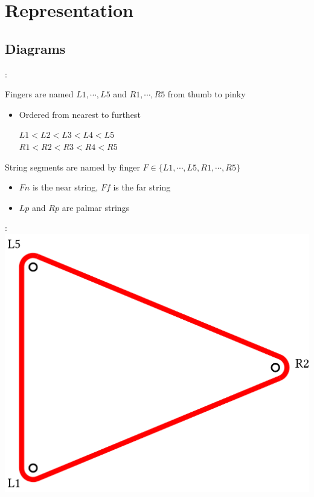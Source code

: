 \newcommand\w[1]{\texttt{[image: \#1]}}
\section{Representation}

\subsection{Diagrams}
\begin{frame}{\secname: \subsecname}

Fingers are named $L1,\cdots, L5$ and $R1,\cdots,R5$ from thumb to pinky

\begin{itemize}
    \item Ordered from nearest to furthest
 \begin{center}
    $L1\lt L2\lt L3\lt L4\lt L5$\\
    $R1\lt R2\lt R3\lt R4\lt R5$    
    \end{center}
\end{itemize}

String segments are named by finger $F\in\{L1,\cdots, L5,R1,\cdots,R5\}$
\begin{itemize}
    \item $Fn$ is the near string, $Ff$ is the far string
    \item $Lp$ and $Rp$ are palmar strings
\end{itemize}
\end{frame}

\begin{frame}{\secname: \subsecname}
\includegraphics[width=0.9\columnwidth]{figures/open.png}
% 
\end{frame}

